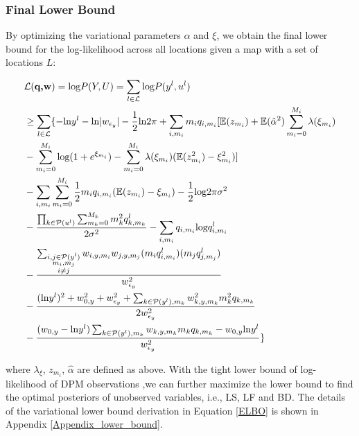 \documentclass[review]{elsarticle}
\begin{document}
\subsubsection{Final Lower Bound}
By optimizing the variational parameters $\alpha$ and $\xi$, we obtain the final lower bound for the log-likelihood across all locations given a map with a set of locations $L$:


\begin{equation}
\begin{aligned}
    & \mathcal{L}(\textbf{q,w})  = \text{log}P(Y,U) = \sum_{l \in \mathcal{L}}\text{log}P(y^{l},u^{l}) \\
    & \geq \sum_{l \in \mathcal{L}} \{-\text{ln}y^{l} - \text{ln}|w_{\epsilon_{y}}| - \frac{1}{2}\text{ln}2\pi + \sum_{i, m_{i}}m_{i}q_{i, m_{i}}[ \mathbb{E}(z_{m_{i}}) + \mathbb{E}(\hat{\alpha}^{2})\sum_{m_{i} = 0}^{M_{i}}\lambda(\xi_{m_{i}})\\
    & -\sum_{m_{i} = 0}^{M_{i}}\text{log}(1+e^{\xi_{m_{i}}}) - \sum_{m_{i} = 0}^{M_{i}}\lambda(\xi_{m_{i}})(\mathbb{E}(z_{m_{i}}^{2})-\xi_{m_{i}}^{2})]\\
    & -\sum_{i, m_{i}}\sum_{m_{i} = 0}^{M_{i}}\frac{1}{2}m_{i}q_{i, m_{i}}(\mathbb{E}(z_{m_{i}}) - \xi_{m_{i}}) -\frac{1}{2}\text{log}2\pi \sigma^2 \\
    & - \frac{\prod_{k\in \mathcal{P}(u^l)}\sum_{m_{k} = 0}^{M_{k}}m_{k}^2 q^l_{k,m_{k}}}{2\sigma^2}  - \sum_{i,m_{i}}q_{i,m_i}\text{log}q^l_{i,m_i}\\
    & - \frac{\sum_{\begin{subarray}{c} i,j \in \mathcal{P}(y^l)\\ m_{i}, m_{j}\\ i \neq j\end{subarray}}w_{i,y,m_{i}}w_{j,y,m_{j}}(m_{i}q^l_{i,m_{i}})(m_{j} q^l_{j,m_{j}})}{w_{\epsilon_{y}}^2} \\ 
    & - \frac{(\text{ln}y^{l})^2 + w_{0,y}^2 + w_{\epsilon_{y}}^2 + \sum_{k \in \mathcal{P}(y^{l}), m_{k}}w_{k,y,m_{k}}^2 m_{k}^2 q_{k,m_{k}}}{2w_{\epsilon_{y}}^2} \\
    & - \frac{(w_{0,y}-\text{ln}y^l)\sum_{k \in \mathcal{P}(y^l), m_{k}}w_{k,y,m_{k}} m_{k}q_{k, m_{k}}- w_{0,y}\text{ln}y^l}{w_{\epsilon_{y}}^2} \}
\label{ELBO}
\end{aligned}
\end{equation}

\noindent where $\lambda_{\xi}$, $z_{m_{i}}$, $\hat{\alpha}$ are defined as above. With the tight lower bound of log-likelihood of DPM observations ,we can further maximize the lower bound to find the optimal posteriors of unobserved variables, i.e., LS, LF and BD. The details of the variational lower bound derivation in Equation \ref{ELBO} is shown in Appendix \ref{Appendix_lower_bound}.
\end{document}
